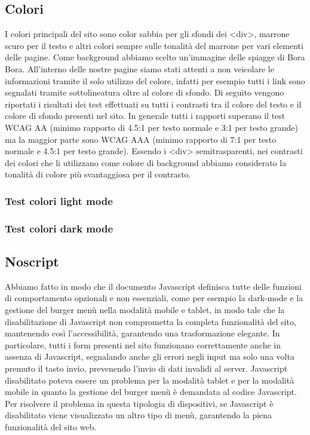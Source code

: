 \documentclass[a4paper]{article}
\begin{document}
	\subsection{Colori}
	I colori principali del sito sono color sabbia per gli sfondi dei <div>, marrone scuro per il testo e altri colori sempre sulle tonalità del marrone per vari elementi delle pagine. Come background abbiamo scelto un'immagine delle spiagge di Bora Bora. All'interno delle nostre pagine siamo stati attenti a non veicolare le informazioni tramite il solo utilizzo del colore, infatti per esempio tutti i link sono segnalati tramite sottolineatura oltre al colore di sfondo. Di seguito vengono riportati i risultati dei test effettuati su tutti i contrasti tra il colore del testo e il colore di sfondo presenti nel sito. In generale tutti i rapporti superano il test WCAG AA (minimo rapporto di 4.5:1 per testo normale e 3:1 per testo grande) ma la maggior parte sono WCAG AAA (minimo rapporto di 7:1 per testo normale e 4.5:1 per testo grande). Essendo i <div> semitrasparenti, nei contrasti dei colori che li utilizzano come colore di background abbiamo considerato la tonalità di colore più svantaggiosa per il contrasto.


	\subsubsection{Test colori light mode}

	\subsubsection{Test colori dark mode}

	\subsection{Noscript}
	Abbiamo fatto in modo che il documento Javascript definisca tutte delle funzioni di comportamento opzionali e non essenziali, come per esempio la dark-mode e la gestione del burger menù nella modalità mobile e tablet, in modo tale che la disabilitazione di Javascript non comprometta la completa funzionalità del sito, mantenendo così l'accessibilità, garantendo una trasformazione elegante. In particolare, tutti i form presenti nel sito funzionano correttamente anche in assenza di Javascript, segnalando anche gli errori negli input ma solo una volta premuto il tasto invio, prevenendo l'invio di dati invalidi al server. Javascript disabilitato poteva essere un problema per la modalità tablet e per la modalità mobile in quanto la gestione del burger menù è demandata al codice Javascript. Per risolvere il problema in questa tipologia di dispositivi, se Javascript è disabilitato viene visualizzato un altro tipo di menù, garantendo la piena funzionalità del sito web.
	
\end{document}
